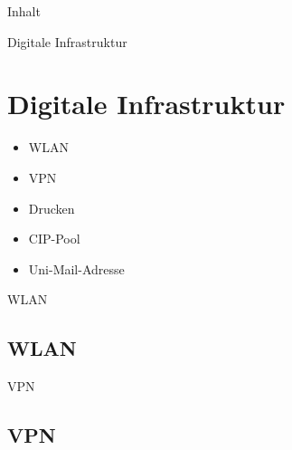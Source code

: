 




\begin{frame}[plain]
  \titlepage
\end{frame}

\begin{frame}{Inhalt}
  \tableofcontents
\end{frame}


\begin{frame}{Digitale Infrastruktur}
  \section{Digitale Infrastruktur}
    \begin{itemize}
      \item{WLAN}
      \item{VPN}
      \item{Drucken}
      \item{CIP-Pool}
      \item{Uni-Mail-Adresse}
    \end{itemize}
\end{frame}


\begin{frame}{WLAN}
  \subsection{WLAN}
\end{frame}


\begin{frame}{VPN}
  \subsection{VPN}
\end{frame}


